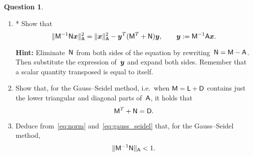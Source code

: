 \documentclass[11pt]{article}
\theoremstyle{definition}
\newtheorem{question}{Question}
\theoremstyle{remark}
\theoremstyle{plain}%
\begin{document}
\begin{question}
\begin{enumerate}
        \item
            *
            Show that
            \begin{equation}
                \label{eq:norm}
                \lVert\mathsf M^{-1} \mathsf N \mathbf{\boldsymbol{x}}\rVert_{\mathsf A}^2
                = \lVert\mathbf{\boldsymbol{x}}\rVert_{\mathsf A}^2 - \mathbf{\boldsymbol{y}}^T (\mathsf M^T + \mathsf N) \mathbf{\boldsymbol{y}},
                \qquad \mathbf{\boldsymbol{y}} :=  \mathsf M^{-1} \mathsf A \mathbf{\boldsymbol{x}}.
            \end{equation}

            \textbf{Hint: } Eliminate~$\mathsf N$ from both sides of the equation by rewriting~$\mathsf N = \mathsf M - \mathsf A$.
            Then substitute the expression of~$\mathbf{\boldsymbol{y}}$ and expand both sides.
            Remember that a scalar quantity transposed is equal to itself.

        \item
            \mymark
            Show that, for the Gauss--Seidel method,
            i.e.\ when $\mathsf M = \mathsf L + \mathsf D$ contains just the lower triangular and diagonal parts of~$\mathsf A$,
            it holds that
            \begin{equation}
                \label{eq:gauss_seidel}
                \mathsf M^T + \mathsf N = \mathsf D.
            \end{equation}

        \item
            Deduce from~\eqref{eq:norm} and~\eqref{eq:gauss_seidel} that,
            for the Gauss--Seidel method,
            \[
                \lVert\mathsf M^{-1} \mathsf N\rVert_{\mathsf A} < 1.
            \]
    \end{enumerate}
\end{question}
\end{document}
